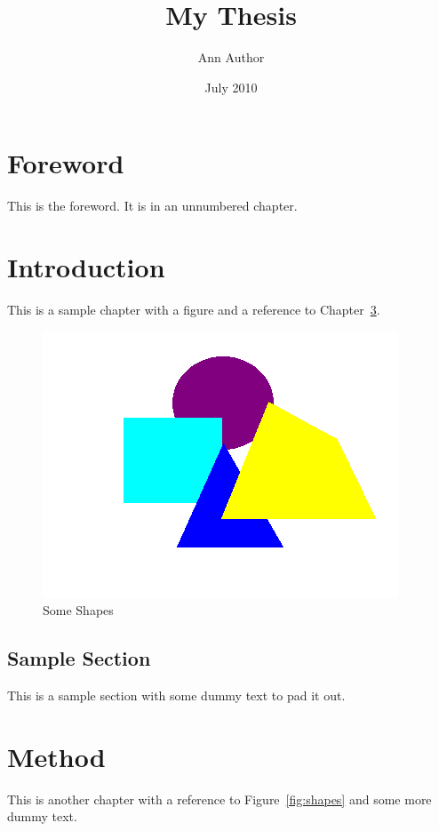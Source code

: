 \documentclass[oneside,numbers=noenddot]{scrbook}
\title{My Thesis}
\author{Ann Author}
\date{July 2010}
\begin{document}
\maketitle

\frontmatter
\tableofcontents
\listoffigures

\chapter{Foreword}

This is the foreword. It is in an unnumbered chapter.

\mainmatter
\chapter{Introduction}

This is a sample chapter with a figure and a reference to Chapter~\ref{ch:method}.

\begin{figure}[htbp]
\centering
\includegraphics{shapes}
\caption{Some Shapes}
\end{figure}

\section{Sample Section}

This is a sample section with some dummy text to pad it out. \lipsum

\chapter{Method}\label{ch:method}

This is another chapter with a reference to Figure~\ref{fig:shapes}
and some more dummy text.
\end{document}
